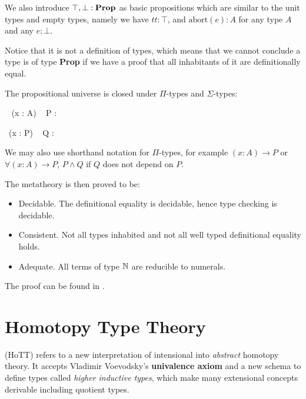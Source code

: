 
We also introduce $\top, \bot : \operatorname{\mathbf{Prop}}$ as basic propositions which are similar to the unit types and empty types, namely we have $tt : \top$, and $\text{abort}(e) : A$ for any type $A$ and any $e : \bot$.

 Notice that it is not a definition of types, which means
that we cannot conclude a type is of type \textbf{Prop} if we have a
proof that all inhabitants of it are definitionally equal.

The propositional universe is closed under $\Pi$-types and $\Sigma$-types:

{\Gamma \vdash \Pi~ (x : A) ~ P : \Prop}


{\Gamma \vdash \Sigma ~(x : P) ~ Q : \Prop}

We may also use shorthand notation for $\Pi$-types, for example $(x:A) \to P$ or $\forall (x : A) \to P$, $P \wedge Q$ if $Q$ does not depend on $P$.


The metatheory is then proved to be:

\begin{itemize}
\item Decidable. The definitional equality is decidable, hence type checking is decidable.

\item Consistent. Not all types inhabited and not all well typed definitional equality holds. 

\item Adequate. All terms of type $\mathbb{N}$ are reducible to numerals.
\end{itemize}

The proof can be found in \cite{alti:lics99}.


\section{Homotopy Type Theory}\label{hott}

\hott (HoTT) refers to a new interpretation of intensional \mltt
into \emph{abstract} homotopy theory.
It accepts Vladimir Voevodsky's \textbf{univalence axiom} and a new schema to define types called \emph{higher inductive types}, which make many extensional concepts derivable including quotient types.



